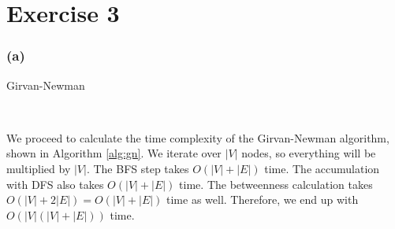 \documentclass{article}
\begin{document}
\section*{Exercise 3}

\subsubsection*{(a)}

\begin{algorithm}[hbt!]
\caption{Girvan-Newman}\label{alg:gn}
\begin{algorithmic}[1]

    \EndFor
    \\
        
        \EndFor
        
        
        \EndFor
        
            
            \EndFor
            
            \EndFor
        \EndFor
        \EndFor
    \EndFor
\end{algorithmic}
\end{algorithm}

We proceed to calculate the time complexity of the Girvan-Newman algorithm,
shown in Algorithm \ref{alg:gn}.
We iterate over \(|V|\) nodes, so everything will be multiplied by \(|V|\).
The BFS step takes \(O(|V| + |E|)\) time.
The accumulation with DFS also takes \(O(|V| + |E|)\) time.
The betweenness calculation takes \(O(|V|+2|E|) = O(|V| + |E|)\) time as well.
Therefore, we end up with \(O(|V| (|V| + |E|))\) time.
\end{document}
